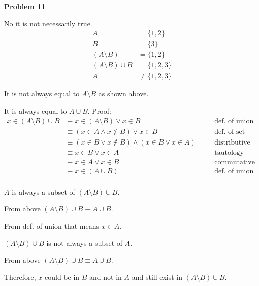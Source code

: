 \textbf{Problem 11}

No it is not necessarily true.
\begin{align*}
A &= \{1, 2\} \\
B &= \{3\} \\
(A \setminus B) &= \{1, 2\} \\
(A \setminus B) \cup B &= \{1, 2, 3\} \\
A &\not = \{1, 2, 3\}
\end{align*}

It is not always equal to $A \setminus B$ as shown above.

It is always equal to $A \cup B$. Proof:
\begin{align*}
x \in (A \setminus B) \cup B &\equiv x \in (A \setminus B) \vee x \in B &&\quad \text{def. of union} \\
&\equiv (x \in A \wedge x \not \in B) \vee x \in B &&\quad \text{def. of set difference} \\
&\equiv (x \in B \vee x \not \in B) \wedge (x \in B \vee x \in A) &&\quad \text{distributive} \\
&\equiv x \in B \vee x \in A &&\quad \text{tautology} \\
&\equiv x \in A  \vee x \in B &&\quad \text{commutative} \\
&\equiv x \in (A \cup B) &&\quad \text{def. of union} \\
\end{align*}

$A$ is always a subset of $(A \setminus B) \cup B$. 

From above $(A \setminus B) \cup B \equiv A \cup B$.

From def. of union that means $x \in A$.

$(A \setminus B) \cup B $ is not always a subset of $A$.

From above $(A \setminus B) \cup B \equiv A \cup B$.

Therefore, $x$ could be in $B$ and not in $A$ and still exist in $(A \setminus B) \cup B$.

